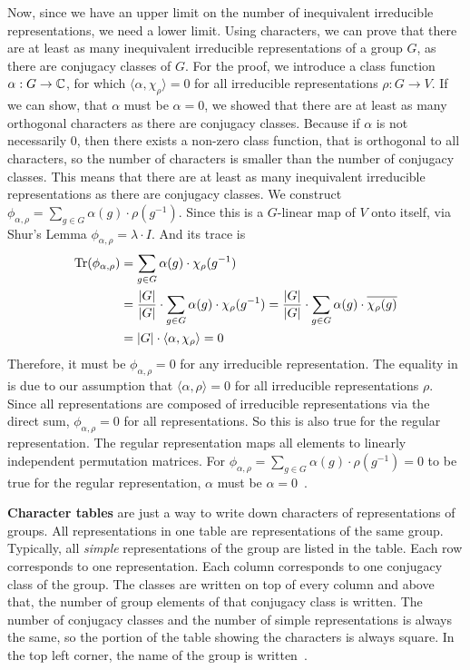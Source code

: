 Now, since we have an upper limit on the number of inequivalent irreducible representations, we need a lower limit.
Using characters, we can prove that there are at least as many inequivalent irreducible representations of a group $G$, as there are conjugacy classes of $G$.
For the proof, we introduce a class function $\alpha: G \to \mathbb{C}$, for which $\langle \alpha, \chi_\rho \rangle = 0$ for all irreducible representations $\rho: G \to V$.
If we can show, that $\alpha$ must be $\alpha = 0$, we showed that there are at least as many orthogonal characters as there are conjugacy classes.
Because if $\alpha$ is not necessarily $0$, then there exists a non-zero class function, that is orthogonal to all characters, so the number of characters is smaller than the number of conjugacy classes.
This means that there are at least as many inequivalent irreducible representations as there are conjugacy classes.
We construct $\phi_{\alpha, \rho} = \sum_{g \in G} \alpha(g) \cdot \rho(g^{-1})$.
Since this is a $G$-linear map of $V$ onto itself, via Shur's Lemma $\phi_{\alpha, \rho} = \lambda \cdot I$.
And its trace is
\begin{subequations}
\begin{align}
    \operatorname{Tr}(\phi_{\alpha, \rho}) & = \sum_{g \in G} \alpha(g) \cdot \chi_\rho(g^{-1}) \\
    & = \dfrac{|G|}{|G|} \cdot \sum_{g \in G} \alpha(g) \cdot \chi_\rho(g^{-1})
    = \dfrac{|G|}{|G|} \cdot \sum_{g \in G} \alpha(g) \cdot \overline{\chi_\rho(g)} \\
    & = |G| \cdot \langle \alpha, \chi_\rho \rangle = 0 \label{equ:numirr.numconj.last}
\end{align}
\end{subequations}
Therefore, it must be $\phi_{\alpha, \rho} = 0$ for any irreducible representation.
The equality in  is due to our assumption that $\langle \alpha, \rho \rangle = 0$ for all irreducible representations $\rho$.
Since all representations are composed of irreducible representations via the direct sum, $\phi_{\alpha, \rho} = 0$ for all representations.
So this is also true for the regular representation.
The regular representation maps all elements to linearly independent permutation matrices.
For $\phi_{\alpha, \rho} = \sum_{g \in G} \alpha(g) \cdot \rho(g^{-1}) = 0$ to be true for the regular representation, $\alpha$ must be $\alpha = 0$~\cite{fulton2013}.

\textbf{Character tables} are just a way to write down characters of representations of groups.
All representations in one table are representations of the same group.
Typically, all \textit{simple} representations of the group are listed in the table.
Each row corresponds to one representation.
Each column corresponds to one conjugacy class of the group.
The classes are written on top of every column and above that, the number of group elements of that conjugacy class is written.
The number of conjugacy classes and the number of simple representations is always the same, so the portion of the table showing the characters is always square.
In the top left corner, the name of the group is written~\cite{fulton2013}.
